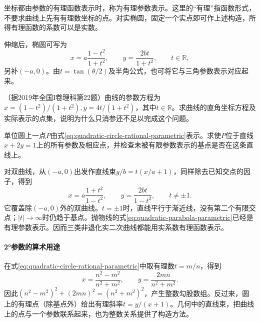 坐标都由参数的有理函数表示时，称为{\heiti{}有理参数表示}。这里的“有理”指函数形式，不要求曲线上先有有理数坐标的点。对实椭圆，固定一个实点即可作上述构造，所得有理函数的系数可以是实数。

伸缩后，椭圆可写为
\begin{equation}\label{eq:quadratic-ellipse-rational-parametric}
    x=a\frac{1-t^2}{1+t^2},\qquad
    y=\frac{2bt}{1+t^2},\qquad t\in\mathbb R ,
\end{equation}
另补\((-a,0)\)。由\(t=\tan(\theta/2)\)及半角公式，也可将它与三角参数表示对应起来。

\par\noindent\begin{minipage}{\linewidth}
\begin{example}
（据2019年全国I卷理科第22题）曲线的参数方程为\(x=(1-t^2)/(1+t^2),y=4t/(1+t^2)\)，其中\(t\in\mathbb R\)。求曲线的直角坐标方程及实际表示的点集，说明为什么只消参还不足以完成这个问题。
\end{example}
\end{minipage}\par


\par\noindent\begin{minipage}{\linewidth}
\begin{example}
单位圆上一点\(P\)由式\eqref{eq:quadratic-circle-rational-parametric}表示。求使\(P\)位于直线\(x+2y=1\)上的所有参数及相应点，并检查未被有限参数表示的基点是否在这条直线上。
\end{example}
\end{minipage}\par

对双曲线，从\((-a,0)\)出发作直线束\(y/b=t(x/a+1)\)，同样除去已知交点的因子，得到
\begin{equation}\label{eq:quadratic-hyperbola-rational-parametric}
    x=a\frac{1+t^2}{1-t^2},\qquad
    y=\frac{2bt}{1-t^2},\qquad t\ne\pm1 .
\end{equation}
它覆盖除\((-a,0)\)外的双曲线。\(t=\pm1\)时，直线平行于渐近线，没有第二个有限交点；\(|t|\to\infty\)时仍趋于基点。抛物线的式\eqref{eq:quadratic-parabola-parametric}已经是有理参数表示。因而三类非退化实二次曲线都能用实系数有理函数表示。

\paragraph{2°参数的算术用途} \mbox{}

在式\eqref{eq:quadratic-circle-rational-parametric}中取有理数\(t=m/n\)，得到
\begin{equation*}
    x=\frac{n^2-m^2}{n^2+m^2},\qquad
    y=\frac{2mn}{n^2+m^2} .
\end{equation*}
因此\((n^2-m^2)^2+(2mn)^2=(n^2+m^2)^2\)，产生整数勾股数组。反过来，圆上的有理点（除基点外）给出有理斜率\(t=y/(x+1)\)。几何中的直线束，把曲线上的点与一个参数联系起来，也为整数关系提供了构造方法。

